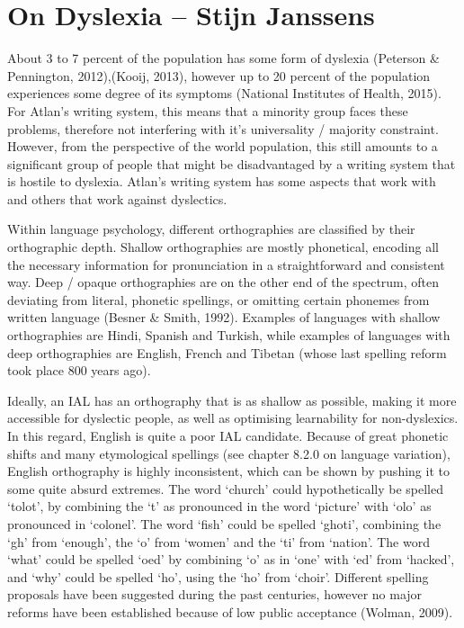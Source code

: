 
 


\section{On Dyslexia -- {\small Stijn Janssens}}

About 3 to 7 percent of the population has some form of dyslexia (Peterson \& Pennington, 2012),(Kooij, 2013), however up to 20 percent of the population experiences some degree of its symptoms (National Institutes of Health, 2015). For Atlan’s writing system, this means that a minority group faces these problems, therefore not interfering with it’s universality / majority constraint. However, from the perspective of the world population, this still amounts to a significant group of people that might be disadvantaged by a writing system that is hostile to dyslexia. Atlan’s writing system has some aspects that work with and others that work against dyslectics.  

Within language psychology, different orthographies are classified by their orthographic depth. Shallow orthographies are mostly phonetical, encoding all the necessary information for pronunciation in a straightforward and consistent way. Deep / opaque orthographies are on the other end of the spectrum, often deviating from literal, phonetic spellings, or omitting certain phonemes from written language (Besner \& Smith, 1992). Examples of languages with shallow orthographies are Hindi, Spanish and Turkish, while examples of languages with deep orthographies are English, French and Tibetan (whose last spelling reform took place 800 years ago).  

Ideally, an IAL has an orthography that is as shallow as possible, making it more accessible for dyslectic people, as well as optimising learnability for non-dyslexics. In this regard, English is quite a poor IAL candidate. Because of great phonetic shifts and many etymological spellings (see chapter 8.2.0 on language variation), English orthography is highly inconsistent, which can be shown by pushing it to some quite absurd extremes. The word ‘church’ could hypothetically be spelled ‘tolot’, by combining the ‘t’ as pronounced in the word ‘picture’ with ‘olo’ as pronounced in ‘colonel’. The word ‘fish’ could be spelled ‘ghoti’, combining the ‘gh’ from ‘enough’, the ‘o’ from ‘women’ and the ‘ti’ from ‘nation’. The word ‘what’ could be spelled ‘oed’ by combining ‘o’ as in ‘one’ with ‘ed’ from ‘hacked’, and ‘why’ could be spelled ‘ho’, using the ‘ho’ from ‘choir’. Different spelling proposals have been suggested during the past centuries, however no major reforms have been established because of low public acceptance (Wolman, 2009). 

